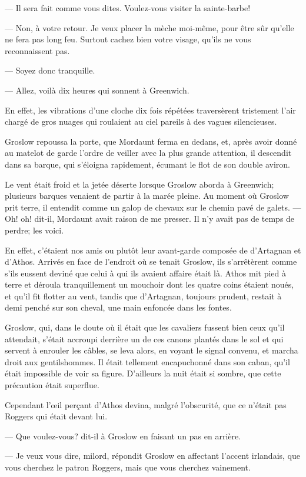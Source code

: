 — Il sera fait comme vous dites. Voulez-vous visiter la sainte-barbe!

— Non, à votre retour. Je veux placer la mèche moi-même, pour être sûr qu'elle ne fera pas long feu. Surtout cachez bien votre visage, qu'ils ne vous reconnaissent pas.

— Soyez donc tranquille.

— Allez, voilà dix heures qui sonnent à Greenwich.

En effet, les vibrations d'une cloche dix fois répétées traversèrent tristement l'air chargé de gros nuages qui roulaient au ciel pareils à des vagues silencieuses.

Groslow repoussa la porte, que Mordaunt ferma en dedans, et, après avoir donné au matelot de garde l'ordre de veiller avec la plus grande attention, il descendit dans sa barque, qui s'éloigna rapidement, écumant le flot de son double aviron.

Le vent était froid et la jetée déserte lorsque Groslow aborda à Greenwich; plusieurs barques venaient de partir à la marée pleine.
Au moment où Groslow prit terre, il entendit comme un galop de chevaux sur le chemin pavé de galets.
— Oh! oh! dit-il, Mordaunt avait raison de me presser. Il n'y avait pas de temps de perdre; les voici.

En effet, c'étaient nos amis ou plutôt leur avant-garde composée de d'Artagnan et d'Athos. Arrivés en face de l'endroit où se tenait Groslow, ils s'arrêtèrent comme s'ils eussent deviné que celui à qui ils avaient affaire était là. Athos mit pied à terre et déroula tranquillement un mouchoir dont les quatre coins étaient noués, et qu'il fit flotter au vent, tandis que d'Artagnan, toujours prudent, restait à demi penché sur son cheval, une main enfoncée dans les fontes.

Groslow, qui, dans le doute où il était que les cavaliers fussent bien ceux qu'il attendait, s'était accroupi derrière un de ces canons plantés dans le sol et qui servent à enrouler les câbles, se leva alors, en voyant le signal convenu, et marcha droit aux gentilshommes. Il était tellement encapuchonné dans son caban, qu'il était impossible de voir sa figure. D'ailleurs la nuit était si sombre, que cette précaution était superflue.

Cependant l'œil perçant d'Athos devina, malgré l'obscurité, que ce n'était pas Roggers qui était devant lui.

— Que voulez-vous? dit-il à Groslow en faisant un pas en arrière.

— Je veux vous dire, milord, répondit Groslow en affectant l'accent irlandais, que vous cherchez le patron Roggers, mais que vous cherchez vainement.


